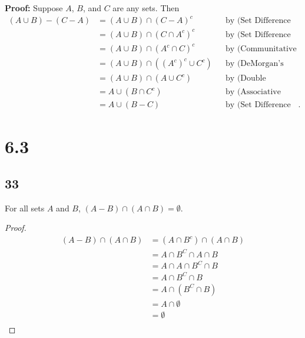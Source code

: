 \documentclass{article}
\begin{document}
\textbf{Proof:} Suppose $A$, $B$, and $C$ are any sets. Then
\begin{align*}
(A \cup B) - (C - A) &= (A \cup B) \cap (C - A)^c && \text{by (Set Difference Law)} \\
                     &= (A \cup B) \cap (C \cap A^c)^c && \text{by (Set Difference Law)} \\
                     &= (A \cup B) \cap (A^c \cap C)^c && \text{by (Communitative Law)} \\
                     &= (A \cup B) \cap ((A^c)^c \cup C^c) && \text{by (DeMorgan's Laws)} \\
                     &= (A \cup B) \cap (A \cup C^c) && \text{by (Double Complement Law)} \\
                     &= A \cup (B \cap C^c) && \text{by (Associative Law)} \\
                     &= A \cup (B - C) && \text{by (Set Difference Law)}.
\end{align*}

\section{6.3}
\subsection{33}
For all sets $A$ and $B$, $(A - B) \cap (A \cap B) = \emptyset$.
\begin{proof}
    \begin{align*}
        (A-B)\cap(A \cap B) &= (A \cap B^c) \cap (A \cap B) \tag{By Set Difference Law}\\
        &= A \cap B^C \cap A \cap B \\
        &= A \cap A \cap B^C \cap B \tag{By Commutative Law}\\
        &= A \cap B^C \cap B \tag{By Idempotent Law}\\
        &= A \cap (B^C \cap B) \tag{By Associative Law}\\
        &= A \cap \emptyset \tag{By Complement Law}\\
        &= \emptyset \tag{By Universal Bound Law}\\
    \end{align*}
\end{proof}
\end{document}
